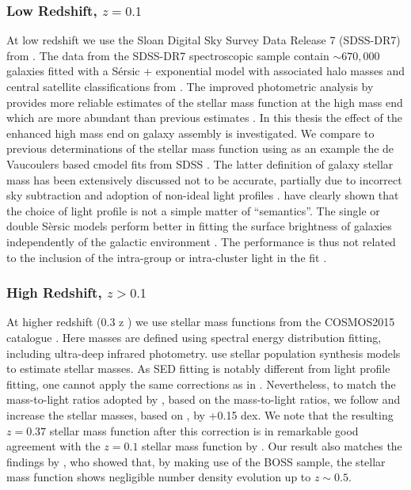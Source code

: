 \subsubsection{Low Redshift, $z = 0.1$}
\label{subsub:SDSS}
At low redshift we use the Sloan Digital Sky Survey Data Release 7 (SDSS-DR7) from \citet{Meert2015ASystematics}.
The data from the SDSS-DR7 spectroscopic sample \citep{Abazajian2009THESURVEY} contain $\sim 670,000$ galaxies fitted with a S\'ersic + exponential model \citep[PyMorph;][]{Meert2015ASystematics} with associated halo masses and central satellite classifications from \citep{Yang2012EvolutionHalos}. The improved photometric analysis by \citet{Meert2015ASystematics} provides more reliable estimates of the stellar mass function at the high mass end which are more abundant than previous estimates \citep{Bernardi2016TheEvolution, Bernardi2017ComparingLight}.
In this thesis the effect of the enhanced high mass end on galaxy assembly is investigated. We compare to previous determinations of the stellar mass function using as an example the de Vaucoulers \citep{deVaucouleurs1948RecherchesExtragalactiques} based cmodel fits from SDSS \citep{Abazajian2009THESURVEY}. The latter definition of galaxy stellar mass has been extensively discussed not to be accurate, partially due to incorrect sky subtraction and adoption of non-ideal light profiles \citep{Bernardi2013TheProfile}. \citet{Bernardi2017ComparingLight} have clearly shown that the choice of light profile is not a simple matter of ``semantics''. The single or double S\`ersic models perform better in fitting the surface brightness of galaxies independently of the galactic environment \citep{Meert2015ASystematics}. The performance is thus not related to the inclusion of the intra-group or intra-cluster light in the fit \citep{Bernardi2017ComparingLight}.

\subsubsection{High Redshift, $z > 0.1$}
\label{subsub:Davidzon}
At higher redshift (0.3 \< z ) we use stellar mass functions from the COSMOS2015 catalogue \citep{Davidzon2017TheSnapshots}. Here masses are defined using spectral energy distribution fitting, including ultra-deep infrared photometry. \citet{Davidzon2017TheSnapshots} use \citet{Bruzual2003Stellar2003} stellar population synthesis models to estimate stellar masses. As SED fitting is notably different from light profile fitting, one cannot apply the same corrections as in \citet{Mendel2014ASURVEY}. 
Nevertheless, to match the mass-to-light ratios adopted by \citet{Mendel2014ASURVEY}, based on the \citet{Bell2003TheFunctions} mass-to-light ratios, we follow \citet{Bernardi2013TheProfile} and increase the \citet{Davidzon2017TheSnapshots} stellar masses, based on \citet{Bruzual2003Stellar2003}, by +0.15 dex. We note that the resulting $z=0.37$ stellar mass function after this correction is in remarkable good agreement with the $z=0.1$ stellar mass function by \citep{Bernardi2013TheProfile}. Our result also matches the findings by \citet{Bernardi2016TheEvolution}, who showed that, by making use of the BOSS sample, the stellar mass function shows negligible number density evolution up to $z \sim 0.5$.

